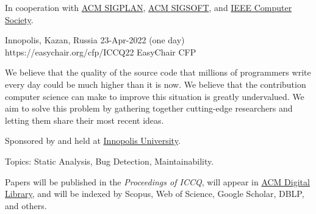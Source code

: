 \documentclass{../cfp}
\begin{document}
\PrintLogo{}


In cooperation
with
\href{https://www.sigplan.org}{ACM SIGPLAN},
\href{https://www.sigsoft.org}{ACM SIGSOFT},\newline
and
\href{https://conferences.ieee.org/conferences_events/conferences/conferencedetails/53703}{IEEE Computer Society}.

\vspace{6pt}

\PrintAddress
  {Innopolis, Kazan, Russia}
  {23-Apr-2022 (one day)}
  {https://easychair.org/cfp/ICCQ22}
  {EasyChair CFP}

\vspace{12pt}
%
%
%
\vspace{12pt}

We believe that the quality of the source code that millions of programmers
write every day could be much higher than it is now. We believe that the
contribution computer science can make to improve this situation is greatly
undervalued. We aim to solve this problem by gathering
together cutting-edge researchers and letting them share their most recent ideas.

Sponsored by and held at \href{https://innopolis.university/en/}{Innopolis University}.

Topics: Static Analysis, Bug Detection, Maintainability.

Papers will be published in the \textit{Proceedings of ICCQ},
will appear in \href{https://dl.acm.org/}{ACM Digital Library},
and will be indexed by Scopus, Web of Science, Google Scholar, DBLP, and others.
\end{document}
